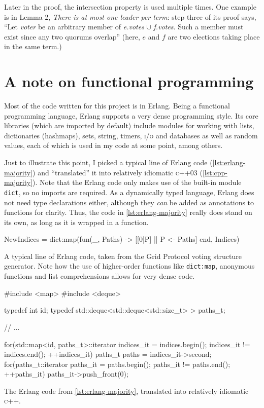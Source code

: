 \documentclass[11pt,chapterprefix=true,toc=bibliography,numbers=noendperiod,
               footnotes=multiple,twoside]{scrreprt}
\begin{document}
Later in the proof, the intersection property is used multiple times. One example is in Lemma 2, \emph{There is at most one leader per term}: step three of its proof says, \enquote{Let \textit{voter} be an arbitrary member of \textit{e.votes} \(\cup\) \textit{f.votes}. Such a member must exist since any two quorums overlap} (here, \(e\) and \(f\) are two elections taking place in the same term.)

\section{A note on functional programming\label{sc:fp-note}}

Most of the code written for this project is in Erlang. Being a functional programming language, Erlang supports a very dense programming style. Its core libraries (which are imported by default) include modules for working with lists, dictionaries (hashmaps), sets, string, timers, \textsc{i/o} and databases as well as random values, each of which is used in my code at some point, among others.

Just to illustrate this point, I picked a typical line of Erlang code (\cref{lst:erlang-majority}) and \enquote{translated} it into relatively idiomatic \textsc{c}++03 (\cref{lst:cpp-majority}). Note that the Erlang code only makes use of the built-in module \texttt{dict}, so no imports are required. As a dynamically typed language, Erlang does not need type declarations either, although they \emph{can} be added as annotations to functions for clarity. Thus, the code in \cref{lst:erlang-majority} really does stand on its own, as long as it is wrapped in a function.

\begin{listing}[h]
    \begin{erlangcode}
NewIndices = dict:map(fun(_, Paths) -> [[0|P] || P <- Paths] end, Indices)
    \end{erlangcode}
    \caption{A typical line of Erlang code, taken from the Grid Protocol voting structure generator. Note how the use of higher-order functions like \texttt{dict:map}, anonymous functions and list comprehensions allows for very dense code.}
    \label{lst:erlang-majority}
\end{listing}

\begin{listing}[h]
    \begin{cppcode}
#include <map>
#include <deque>

typedef int id;
typedef std::deque<std::deque<std::size_t> > paths_t;

// ...

for(std::map<id, paths_t>::iterator indices_it = indices.begin();
        indices_it != indices.end(); ++indices_it) {
    paths_t paths = indices_it->second;
    for(paths_t::iterator paths_it = paths.begin();
            paths_it != paths.end(); ++paths_it) {
        paths_it->push_front(0);
    }
}
    \end{cppcode}
    \caption{The Erlang code from \cref{lst:erlang-majority}, translated into relatively idiomatic \textsc{c}++.}
    \label{lst:cpp-majority}
\end{listing}
\end{document}

